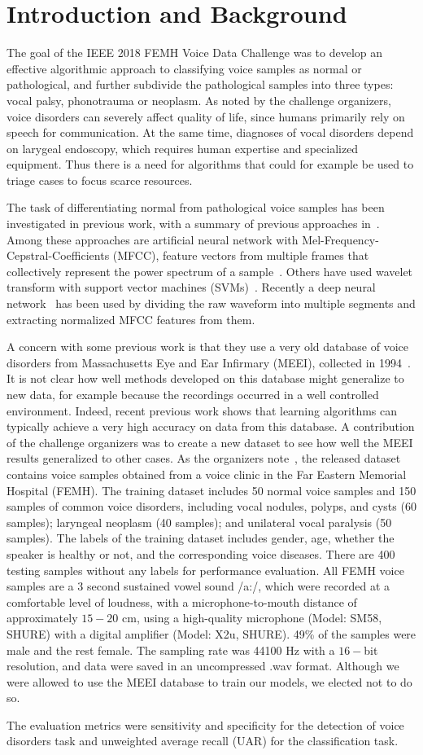 \section{Introduction and Background}
The goal of the IEEE 2018 FEMH Voice Data Challenge was to develop an effective algorithmic approach to classifying voice samples as normal or pathological, and further subdivide the pathological samples into three types: vocal palsy, phonotrauma or neoplasm. As noted by the challenge organizers, voice disorders can severely affect quality of life, since humans primarily rely on speech for communication. At the same time, diagnoses of vocal disorders depend on larygeal endoscopy, which requires human expertise and specialized equipment. Thus there is a need for algorithms that could for example be used to triage cases to focus scarce resources.

The task of differentiating normal from pathological voice samples has been investigated in previous work, with a summary of previous approaches in~\cite{b9}. Among these approaches are artificial neural network with Mel-Frequency-Cepstral-Coefficients (MFCC), feature vectors from multiple frames that collectively represent the power spectrum of a sample~\cite{b32}. Others have used wavelet transform with support vector machines (SVMs)~\cite{b31}. Recently a deep neural network~\cite{b9} has been used by dividing the raw waveform into multiple segments and extracting normalized MFCC features from them.

A concern with some previous work is that they use a very old database of voice disorders from Massachusetts Eye and Ear Infirmary (MEEI), collected in 1994~\cite{b30}. It is not clear how well methods developed on this database might generalize to new data, for example because the recordings occurred in a well controlled environment. Indeed, recent previous work shows that learning algorithms can typically achieve a very high accuracy on data from this database. A contribution of the challenge organizers was to create a new dataset to see how well the MEEI results generalized to other cases. As the organizers note~\cite{b16}, the released dataset contains voice samples obtained from a voice clinic in the Far Eastern Memorial Hospital (FEMH). The training dataset includes 50 normal voice samples and 150 samples of common voice disorders, including vocal nodules, polyps, and cysts (60 samples); laryngeal neoplasm (40 samples); and unilateral vocal paralysis (50 samples). The labels of the training dataset includes gender, age, whether the speaker is healthy or not, and the corresponding voice diseases. There are 400 testing samples without any labels for performance evaluation. All FEMH voice samples are a 3 second sustained vowel sound /a:/, which were recorded at a comfortable level of loudness, with a microphone-to-mouth distance of approximately $15-20$ cm, using a high-quality microphone (Model: SM58, SHURE) with a digital amplifier (Model: X2u, SHURE). 49\% of the samples were male and the rest female. The sampling rate was 44100 Hz with a $16-$bit resolution, and data were saved in an uncompressed .wav format. Although we were allowed to use the MEEI database to train our models, we elected not to do so.

The evaluation metrics were sensitivity and specificity for the detection of voice disorders task and unweighted average recall (UAR) for the classification task.